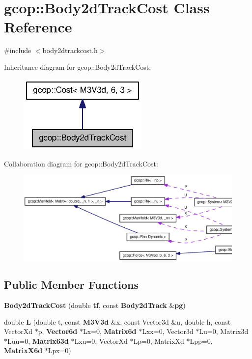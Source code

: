\section{gcop\-:\-:\-Body2d\-Track\-Cost \-Class \-Reference}
\label{classgcop_1_1Body2dTrackCost}


{\ttfamily \#include $<$body2dtrackcost.\-h$>$}



\-Inheritance diagram for gcop\-:\-:\-Body2d\-Track\-Cost\-:\nopagebreak
\begin{figure}[H]
\begin{center}
\leavevmode
\includegraphics[width=180pt]{classgcop_1_1Body2dTrackCost__inherit__graph}
\end{center}
\end{figure}


\-Collaboration diagram for gcop\-:\-:\-Body2d\-Track\-Cost\-:\nopagebreak
\begin{figure}[H]
\begin{center}
\leavevmode
\includegraphics[width=350pt]{classgcop_1_1Body2dTrackCost__coll__graph}
\end{center}
\end{figure}
\subsection*{\-Public \-Member \-Functions}
\begin{DoxyCompactItemize}
\item 
{\bf \-Body2d\-Track\-Cost} (double {\bf tf}, const {\bf \-Body2d\-Track} \&{\bf pg})
\item 
double {\bf \-L} (double t, const {\bf \-M3\-V3d} \&x, const \-Vector3d \&u, double h, const \-Vector\-Xd $\ast$p, {\bf \-Vector6d} $\ast$\-Lx=0, {\bf \-Matrix6d} $\ast$\-Lxx=0, \-Vector3d $\ast$\-Lu=0, \-Matrix3d $\ast$\-Luu=0, {\bf \-Matrix63d} $\ast$\-Lxu=0, \-Vector\-Xd $\ast$\-Lp=0, \-Matrix\-Xd $\ast$\-Lpp=0, {\bf \-Matrix\-X6d} $\ast$\-Lpx=0)
\end{DoxyCompactItemize}
